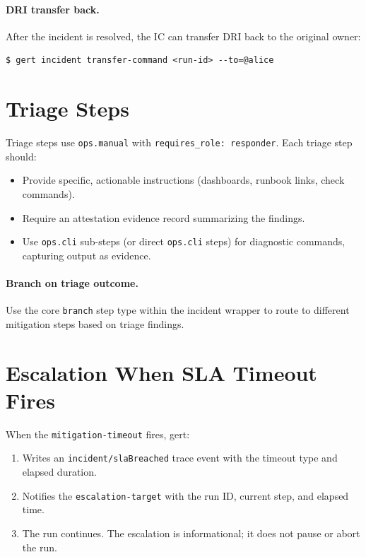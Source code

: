 \paragraph{DRI transfer back.} After the incident is resolved, the IC can transfer DRI back
to the original owner:

\begin{verbatim}
$ gert incident transfer-command <run-id> --to=@alice
\end{verbatim}

\section{Triage Steps}
\label{sec:ir-triage}

Triage steps use \texttt{ops.manual} with \texttt{requires\_role: responder}. Each triage step
should:
\begin{itemize}
  \item Provide specific, actionable instructions (dashboards, runbook links, check commands).
  \item Require an attestation evidence record summarizing the findings.
  \item Use \texttt{ops.cli} sub-steps (or direct \texttt{ops.cli} steps) for diagnostic
    commands, capturing output as evidence.
\end{itemize}

\paragraph{Branch on triage outcome.} Use the core \texttt{branch} step type within the
incident wrapper to route to different mitigation steps based on triage findings.

\section{Escalation When SLA Timeout Fires}
\label{sec:ir-escalation}

When the \texttt{mitigation-timeout} fires, gert:
\begin{enumerate}
  \item Writes an \texttt{incident/slaBreached} trace event with the timeout type and elapsed
    duration.
  \item Notifies the \texttt{escalation-target} with the run ID, current step, and elapsed time.
  \item The run continues. The escalation is informational; it does not pause or abort the run.
\end{enumerate}

